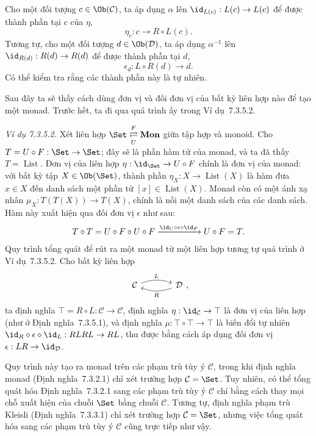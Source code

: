 Cho một đối tượng $c\in\Ob(\mathcal C)$, ta áp dụng $\alpha$ lên $\id_{L(c)}:L(c)\to L(c)$ để được thành phần tại $c$ của $\eta$,
\[
\eta_c:c\longrightarrow R\circ L(c).
\]
Tương tự, cho một đối tượng $d\in\Ob(\mathcal D)$, ta áp dụng $\alpha^{-1}$ lên $\id_{R(d)}:R(d)\to R(d)$ để được thành phần tại $d$,
\[
\epsilon_d:L\circ R(d)\longrightarrow d.
\]
Có thể kiểm tra rằng các thành phần này là tự nhiên.

Sau đây ta sẽ thấy cách dùng đơn vị và đối đơn vị của bất kỳ liên hợp nào để tạo một monad. Trước hết, ta đi qua quá trình ấy trong Ví dụ~7.3.5.2.

\noindent\textit{Ví dụ 7.3.5.2.}\keepwithnext
Xét liên hợp $\Set\underset{U}{\overset{F}{\rightleftarrows}}\mathbf{Mon}$ giữa tập hợp và monoid. Cho $T=U\circ F:\Set\to\Set$; đây sẽ là phần hàm tử của monad, và ta đã thấy $T=\operatorname{List}$. Đơn vị của liên hợp $\eta:\id_{\Set}\to U\circ F$ chính là đơn vị của monad: với bất kỳ tập $X\in\Ob(\Set)$, thành phần $\eta_X:X\to\operatorname{List}(X)$ là hàm đưa $x\in X$ đến danh sách một phần tử $[x]\in\operatorname{List}(X)$. Monad còn có một ánh xạ nhân $\mu_X:T(T(X))\to T(X)$, chính là nối một danh sách của các danh sách. Hàm này xuất hiện qua đối đơn vị $\epsilon$ như sau:
\[
T\circ T=U\circ F\circ U\circ F\xrightarrow{\id_U\diamond\epsilon\diamond\id_F}U\circ F=T.
\]
Quy trình tổng quát để rút ra một monad từ một liên hợp tương tự quá trình ở Ví dụ~7.3.5.2. Cho bất kỳ liên hợp
\[
\begin{tikzcd}[column sep=large]\mathcal C\arrow[r,bend left=20,"L"]&\mathcal D\arrow[l,bend left=20,"R"]\end{tikzcd},
\]
ta định nghĩa $\top=R\circ L:\mathcal C\to\mathcal C$, định nghĩa $\eta:\id_{\mathcal C}\to\top$ là đơn vị của liên hợp (như ở Định nghĩa~7.3.5.1), và định nghĩa $\mu:\top\circ\top\to\top$ là biến đổi tự nhiên $\id_R\diamond\epsilon\diamond\id_L:RLRL\to RL$, thu được bằng cách áp dụng đối đơn vị $\epsilon:LR\to\id_{\mathcal D}$.

Quy trình này tạo ra monad trên các phạm trù tùy ý $\mathcal C$, trong khi định nghĩa monad (Định nghĩa~7.3.2.1) chỉ xét trường hợp $\mathcal C=\Set$. Tuy nhiên, có thể tổng quát hóa Định nghĩa~7.3.2.1 sang các phạm trù tùy ý $\mathcal C$ chỉ bằng cách thay mọi chỗ xuất hiện của chuỗi $\Set$ bằng chuỗi $\mathcal C$. Tương tự, định nghĩa phạm trù Kleisli (Định nghĩa~7.3.3.1) chỉ xét trường hợp $\mathcal C=\Set$, nhưng việc tổng quát hóa sang các phạm trù tùy ý $\mathcal C$ cũng trực tiếp như vậy.


